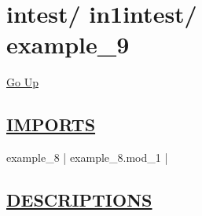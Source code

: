 \chapter*{\color{headfile}
{\large intest\slash\hspace{0pt}}
{\large in1intest\slash\hspace{0pt}}
 \\
example_9
}
\hypertarget{ecldoc:toc:intest.in1intest.example_9}{}
\hyperlink{ecldoc:toc:root/intest/in1intest}{Go Up}

\section*{\underline{\textsf{IMPORTS}}}
\begin{doublespace}
{\large
example\_8 |
example\_8.mod\_1 |
}
\end{doublespace}

\section*{\underline{\textsf{DESCRIPTIONS}}}
